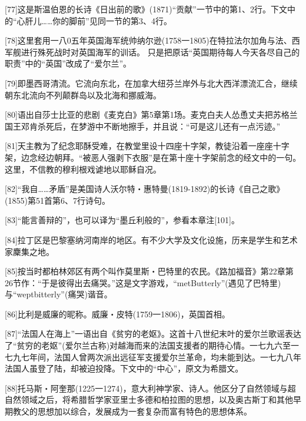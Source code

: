 \documentclass{article}
\begin{document}
[77]这是斯温伯恩的长诗《日出前的歌》(1871)“贡献”一节中的第1、2行。下文中的“心肝儿……你的脚前”见同一节的第3、4行。



[78]这里套用一八0五年英国海军统帅纳尔逊(1758一1805)在特拉法尔加角与法、西军舰进行殊死战时对英国海军的训话。 只是把原话“英国期待每人今天各尽自己的职责”中的“英国”改成了“爱尔兰”。



[79]即墨西哥清流。它流向东北，在加拿大纽芬兰岸外与北大西洋漂流汇合，继续朝东北流向不列颠群岛以及北海和挪威海。



[80]语出自莎士比亚的悲剧《麦克白》第5章第1场。麦克白夫人怂恿丈夫把苏格兰国王邓肯杀死后，在梦游中不断地擦手，并且说：“可是这儿还有一点污迹。”



[81]天主教为了纪念耶酥受难，在教堂里设十四座十字架，教徒沿着一座座十字架，边念经边朝拜。“被恶人强剥下衣服”是在第十座十字架前念的经文中的一句。这里，不信教的穆利根戏谑地以耶稣自况。



[82]“我自……矛盾”是美国诗人沃尔特・惠特曼(1819-1892)的长诗《自己之歌》(1855)第51首第6、7行诗句。



[83]“能言善辩的”，也可以译为“墨丘利般的”，参看本章注[101]。



[84]拉丁区是巴黎塞纳河南岸的地区。有不少大学及文化设施，历来是学生和艺术家麇集之地。



[85]按当时都柏林郊区有两个叫作莫里斯・巴特里的农民。《路加福音》第22章第26节作：“于是彼得出去痛哭。”这是文字游戏，“metButterly”(遇见了巴特里)与“weptbitterly”(痛哭)谐音。



[86]比利是威廉的昵称。威廉・皮特(1759一1806)，英国首相。



[87]“法国人在海上”一语出自《贫穷的老妪》。这首十八世纪末叶的爱尔兰歌谣表达了“贫穷的老妪”(爱尔兰古称)对越海而来的法国支援者的期待心情。一七九六至一七九七年间，法国人曾两次派出远征军支援爱尔兰革命，均未能到达。一七九八年法国人虽登了陆，却被迫投降。下文中的“中心”，原文为希腊文。



[88]托马斯・阿奎那(1225一1274)，意大利神学家、诗人。他区分了自然领域与超自然领域之后，将希腊哲学家亚里士多德和柏拉图的思想，以及奥古斯丁和其他早期教父的思想加以综合，发展成为一套复杂而富有特色的思想体系。
\end{document}

